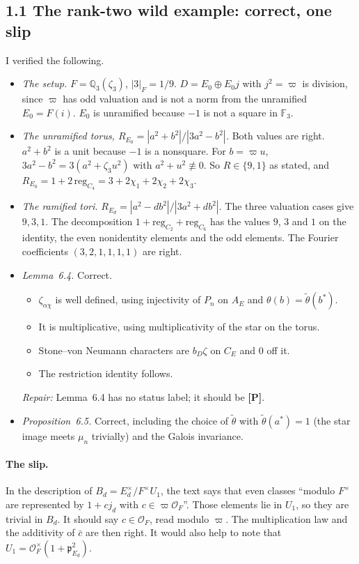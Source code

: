 \documentclass[11pt]{article}
\theoremstyle{plain}
\begin{document}
\subsection*{1.1 The rank-two wild example: correct, one slip}
I verified the following.
\begin{itemize}
\item \emph{The setup.} $F=\mathbb Q_3(\zeta_3)$, $|3|_F=1/9$. $D=E_0\oplus E_0j$ with $j^2=\varpi$ is
division, since $\varpi$ has odd valuation and is not a norm from the
unramified $E_0=F(i)$. $E_0$ is unramified because $-1$ is not a square
in $\mathbb F_3$.
\item \emph{The unramified torus, $R_{E_0}=|a^2+b^2|/|3a^2-b^2|$.} Both
values are right. $a^2+b^2$ is a unit because $-1$ is a nonsquare. For
$b=\varpi u$, $3a^2-b^2=3(a^2+\zeta_3u^2)$ with $a^2+u^2\not\equiv0$.
So $R\in\{9,1\}$ as stated, and
$R_{E_0}=1+2\,\mathrm{reg}_{C_4}=3+2\chi_1+2\chi_2+2\chi_3$.
\item \emph{The ramified tori.} $R_{E_d}=|a^2-db^2|/|3a^2+db^2|$. The
three valuation cases give $9,3,1$. The decomposition
$1+\mathrm{reg}_{C_2}+\mathrm{reg}_{C_6}$ has the values $9$, $3$ and
$1$ on the identity, the even nonidentity elements and the odd elements.
The Fourier coefficients $(3,2,1,1,1,1)$ are right.
\item \emph{Lemma~6.4.} Correct.
\begin{itemize}
\item $\zeta_{\alpha\chi}$ is well defined, using injectivity of $P_n$ on
$A_E$ and $\theta(b)=\tilde\theta(b^*)$.
\item It is multiplicative, using multiplicativity of the star on the
torus.
\item Stone--von Neumann characters are $b_D\zeta$ on $C_E$ and $0$
off it.
\item The restriction identity follows.
\end{itemize}
\emph{Repair:} Lemma~6.4 has no status label; it should be \textbf{[P]}.
\item \emph{Proposition~6.5.} Correct, including the choice of
$\tilde\theta$ with $\tilde\theta(a^*)=1$ (the star image meets $\mu_n$
trivially) and the Galois invariance.
\end{itemize}

\paragraph{The slip.} In the description of
$B_d=E_d^\times/F^\times U_1$, the text says that even classes ``modulo
$F^\times$ are represented by $1+cj_d$ with $c\in\varpi\mathcal O_F$''.
Those elements lie in $U_1$, so they are trivial in $B_d$. It should say
$c\in\mathcal O_F$, read modulo $\varpi$. The multiplication law and the
additivity of $\bar c$ are then right. It would also help to note that
$U_1=\mathcal O_F^\times(1+\mathfrak p_{E_d}^2)$.
\end{document}
